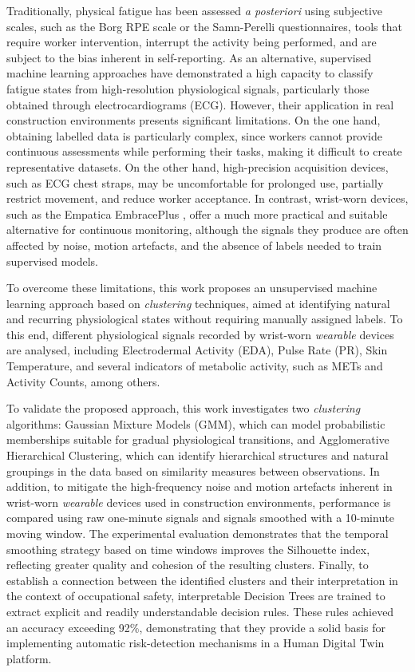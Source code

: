 \documentclass[a4paper,fleqn]{cas-sc}
\begin{document}
Traditionally, physical fatigue has been assessed \textit{a posteriori} using subjective scales, such as the Borg RPE scale or the Samn-Perelli questionnaires, tools that require worker intervention, interrupt the activity being performed, and are subject to the bias inherent in self-reporting. As an alternative, supervised machine learning approaches have demonstrated a high capacity to classify fatigue states from high-resolution physiological signals, particularly those obtained through electrocardiograms (ECG). However, their application in real construction environments presents significant limitations. On the one hand, obtaining labelled data is particularly complex, since workers cannot provide continuous assessments while performing their tasks, making it difficult to create representative datasets. On the other hand, high-precision acquisition devices, such as ECG chest straps, may be uncomfortable for prolonged use, partially restrict movement, and reduce worker acceptance. In contrast, wrist-worn devices, such as the Empatica EmbracePlus \cite{empatica_embraceplus}, offer a much more practical and suitable alternative for continuous monitoring, although the signals they produce are often affected by noise, motion artefacts, and the absence of labels needed to train supervised models.

To overcome these limitations, this work proposes an unsupervised machine learning approach based on \textit{clustering} techniques, aimed at identifying natural and recurring physiological states without requiring manually assigned labels. To this end, different physiological signals recorded by wrist-worn \textit{wearable} devices are analysed, including Electrodermal Activity (EDA), Pulse Rate (PR), Skin Temperature, and several indicators of metabolic activity, such as METs and Activity Counts, among others.

To validate the proposed approach, this work investigates two \textit{clustering} algorithms: Gaussian Mixture Models (GMM), which can model probabilistic memberships suitable for gradual physiological transitions, and Agglomerative Hierarchical Clustering, which can identify hierarchical structures and natural groupings in the data based on similarity measures between observations. In addition, to mitigate the high-frequency noise and motion artefacts inherent in wrist-worn \textit{wearable} devices used in construction environments, performance is compared using raw one-minute signals and signals smoothed with a 10-minute moving window. The experimental evaluation demonstrates that the temporal smoothing strategy based on time windows improves the Silhouette index, reflecting greater quality and cohesion of the resulting clusters. Finally, to establish a connection between the identified clusters and their interpretation in the context of occupational safety, interpretable Decision Trees are trained to extract explicit and readily understandable decision rules. These rules achieved an accuracy exceeding 92\%, demonstrating that they provide a solid basis for implementing automatic risk-detection mechanisms in a Human Digital Twin platform.
\end{document}

